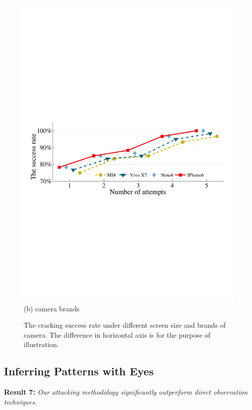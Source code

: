 \begin{figure}[!t]
{\begin{minipage}[t]{0.4\textwidth}
                \includegraphics[width=\textwidth]{fig/camera_brands.pdf}\\
                \centering \footnotesize (b) camera brands
             \end{minipage}
        }
        \caption{The cracking success rate under different screen size and brands of camera. The difference in horizontal axis is for the purpose of illustration.}
        \label{fig:screen_size}
    \end{figure}

    \subsection{Inferring Patterns with Eyes}

    \noindent \textbf{Result 7:} \emph{Our attacking methodology significantly outperform direct observation techniques.}

